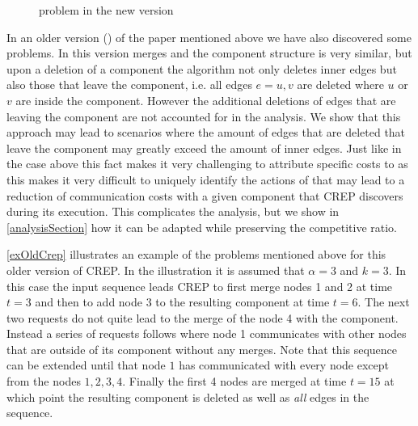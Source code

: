 \documentclass[xcolor=dvipsnames, tikz, 12pt]{article}
\newcommand{\crep}{C{\scriptsize REP}}
\newcommand{\opt}{\text{O{\scriptsize PT}}}
\newcommand{\request}[3]{\draw (axis cs:#3,#1) -- node[left]{} (axis cs:#3,#2);}
\theoremstyle{definition}
\begin{document}
	\begin{figure}
		\caption{problem in the new version}\label{exNewCrep}	
	\end{figure}
	
	In an older version (\cite{Avin2015}) of the paper mentioned above we have also discovered some problems. In this version merges and the component structure is very similar, but upon a deletion of a component the algorithm not only deletes inner edges but also those that leave the component, i.e. all edges $e={u,v}$ are deleted where $u$ or $v$ are inside the component. However the additional deletions of edges that are leaving the component are not accounted for in the analysis. We show that this approach may lead to scenarios where the amount of edges that are deleted that leave the component may greatly exceed the amount of inner edges. Just like in the case above this fact makes it very challenging to attribute specific costs to \opt{} as this makes it very difficult to uniquely identify the actions of \opt{} that may lead to a reduction of communication costs with a given component that \crep{} discovers during its execution. This complicates the analysis, but we show in \cref{analysisSection} how it can be adapted while preserving the competitive ratio.
	
	\cref{exOldCrep} illustrates an example of the problems mentioned above for this older version of \crep{}. In the illustration it is assumed that $\alpha=3$ and $k=3$. In this case the input sequence leads \crep{} to first merge nodes 1 and 2 at time $t=3$ and then to add node 3 to the resulting component at time $t= 6$. The next two requests do not quite lead to the merge of the node 4 with the component. Instead a series of requests follows where node 1 communicates with other nodes that are outside of its component without any merges. Note that this sequence can be extended until that node $1$ has communicated with every node except from the nodes $1,2,3,4$. Finally the first 4 nodes are merged at time $t=15$ at which point the resulting component is deleted as well as \textit{all} edges in the sequence. 
\end{document}
